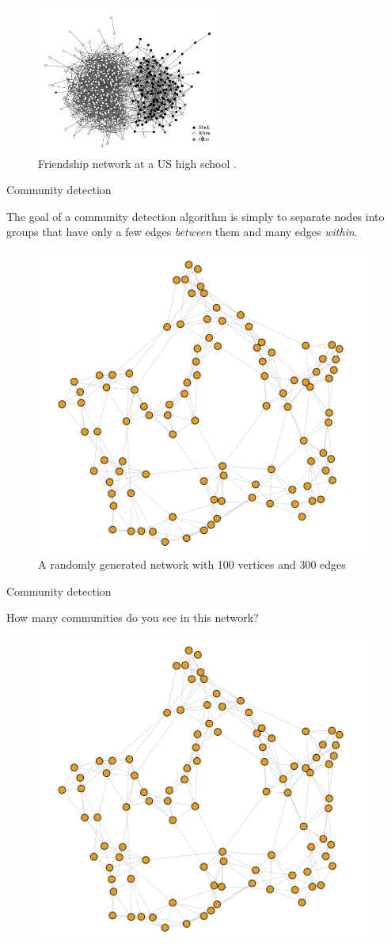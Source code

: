 \documentclass[serif, aspectratio=169]{beamer}
\begin{document}
\begin{frame}

\begin{figure}
    \centering
    \includegraphics[width=0.55\textwidth]{figure/race_network}
\caption{Friendship network at a US high school \autocite[221]{newman_networks_2010}.}
\end{figure}

\end{frame}

\begin{frame}
{Community detection}

The goal of a community detection algorithm is simply to separate nodes into groups that have only a few edges \textit{between} them and many edges \textit{within}.

\begin{figure}
    \includegraphics[width=0.4\linewidth]{figure/sample_smallworld}
\caption{A randomly generated network with 100 vertices and 300 edges}
\end{figure}

\end{frame}

\begin{frame}
{Community detection}

How many communities do you see in this network?

\begin{figure}
    \includegraphics[width=0.4\linewidth]{figure/sample_smallworld}
\end{figure}

\end{frame}
\end{document}
